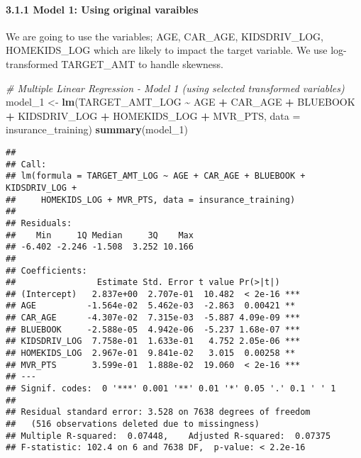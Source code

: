 \documentclass[
]{article}
\newenvironment{Shaded}{\begin{snugshade}}{\end{snugshade}}
\newcommand{\AttributeTok}[1]{\textcolor[rgb]{0.13,0.29,0.53}{#1}}
\newcommand{\CommentTok}[1]{\textcolor[rgb]{0.56,0.35,0.01}{\textit{#1}}}
\newcommand{\FunctionTok}[1]{\textcolor[rgb]{0.13,0.29,0.53}{\textbf{#1}}}
\newcommand{\NormalTok}[1]{#1}
\newcommand{\OtherTok}[1]{\textcolor[rgb]{0.56,0.35,0.01}{#1}}
\newcommand{\SpecialCharTok}[1]{\textcolor[rgb]{0.81,0.36,0.00}{\textbf{#1}}}
\begin{document}
\paragraph{3.1.1 Model 1: Using original
varaibles}\label{model-1-using-original-varaibles}

We are going to use the variables; AGE, CAR\_AGE, KIDSDRIV\_LOG,
HOMEKIDS\_LOG which are likely to impact the target variable. We use
log-transformed TARGET\_AMT to handle skewness.

\begin{Shaded}
\begin{Highlighting}[]
\CommentTok{\# Multiple Linear Regression {-} Model 1 (using selected transformed variables)}
\NormalTok{model\_1 }\OtherTok{\textless{}{-}} \FunctionTok{lm}\NormalTok{(TARGET\_AMT\_LOG }\SpecialCharTok{\textasciitilde{}}\NormalTok{ AGE }\SpecialCharTok{+}\NormalTok{ CAR\_AGE }\SpecialCharTok{+}\NormalTok{ BLUEBOOK }\SpecialCharTok{+}\NormalTok{ KIDSDRIV\_LOG }\SpecialCharTok{+}\NormalTok{ HOMEKIDS\_LOG }\SpecialCharTok{+}\NormalTok{ MVR\_PTS, }\AttributeTok{data =}\NormalTok{ insurance\_training)}
\FunctionTok{summary}\NormalTok{(model\_1)}
\end{Highlighting}
\end{Shaded}

\begin{verbatim}
## 
## Call:
## lm(formula = TARGET_AMT_LOG ~ AGE + CAR_AGE + BLUEBOOK + KIDSDRIV_LOG + 
##     HOMEKIDS_LOG + MVR_PTS, data = insurance_training)
## 
## Residuals:
##    Min     1Q Median     3Q    Max 
## -6.402 -2.246 -1.508  3.252 10.166 
## 
## Coefficients:
##                Estimate Std. Error t value Pr(>|t|)    
## (Intercept)   2.837e+00  2.707e-01  10.482  < 2e-16 ***
## AGE          -1.564e-02  5.462e-03  -2.863  0.00421 ** 
## CAR_AGE      -4.307e-02  7.315e-03  -5.887 4.09e-09 ***
## BLUEBOOK     -2.588e-05  4.942e-06  -5.237 1.68e-07 ***
## KIDSDRIV_LOG  7.758e-01  1.633e-01   4.752 2.05e-06 ***
## HOMEKIDS_LOG  2.967e-01  9.841e-02   3.015  0.00258 ** 
## MVR_PTS       3.599e-01  1.888e-02  19.060  < 2e-16 ***
## ---
## Signif. codes:  0 '***' 0.001 '**' 0.01 '*' 0.05 '.' 0.1 ' ' 1
## 
## Residual standard error: 3.528 on 7638 degrees of freedom
##   (516 observations deleted due to missingness)
## Multiple R-squared:  0.07448,    Adjusted R-squared:  0.07375 
## F-statistic: 102.4 on 6 and 7638 DF,  p-value: < 2.2e-16
\end{verbatim}
\end{document}
